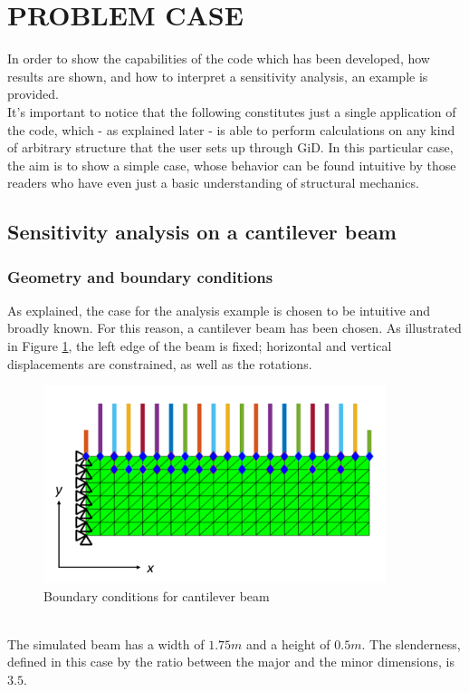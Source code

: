 \section{PROBLEM CASE}

In order to show the capabilities of the code which has been developed, how results are shown, and how to interpret a sensitivity analysis, an example is provided.\\[3pt]
It's important to notice that the following constitutes just a single application of the code, which - as explained later - is able to perform calculations on any kind of arbitrary structure that the user sets up through GiD. In this particular case, the aim is to show a simple case, whose behavior can be found intuitive by those readers who have even just a basic understanding of structural mechanics.

\subsection{Sensitivity analysis on a cantilever beam}
\subsubsection{Geometry and boundary conditions}
As explained, the case for the analysis example is chosen to be intuitive and broadly known. For this reason, a cantilever beam has been chosen. As illustrated in Figure \ref{cantileverBeam:BCs}, the left edge of the beam is fixed; horizontal and vertical displacements are constrained, as well as the rotations.\\
\begin{figure}[ht]
\centering
  \includegraphics[width=100mm]{images/cantileverBeamBCs.png}
  \caption{Boundary conditions for cantilever beam}
  \label{cantileverBeam:BCs}
\end{figure} \\
The simulated beam has a width of $1.75m$ and a height of $0.5m$.
The slenderness, defined in this case by the ratio between the major and the minor dimensions, is  $3.5$. 
